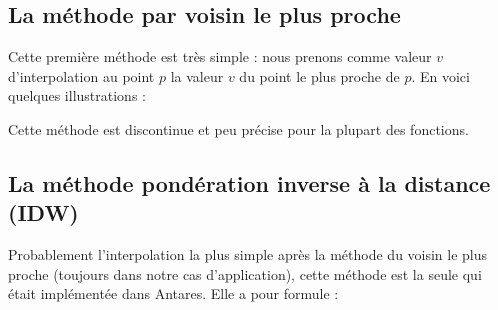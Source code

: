 \newpage

\subsection{La méthode par voisin le plus proche}
Cette première méthode est très simple : nous prenons comme valeur \( v \) d'interpolation au point \( p \) la valeur \( v \) du point le plus proche de \( p \).
En voici quelques illustrations :


\begin{center}
\end{center}

\vspace{0.5cm}

Cette méthode est discontinue et peu précise pour la plupart des fonctions.



\subsection{La méthode pondération inverse à la distance (IDW)} %

Probablement l'interpolation la plus simple après la méthode du voisin le plus proche (toujours dans notre cas d'application), cette méthode est la seule qui était implémentée dans Antares. Elle a pour formule :


